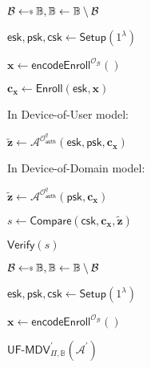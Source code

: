 \begin{figure}[h]
\centering
\vspace*{-\multicolsep}
\begin{multicols}{2}

	\begin{minipage}[t]{0.9\linewidth}
	\begin{algorithm}[H]
	\caption{$\textsf{UF-MDV}_{\Pi, \mathbb{B}}(\mathcal{A})$}
	\label{alg:uf-mdv_game}
	\begin{algorithmic}[1]
		\State $\mathcal{B} \getsdollar \mathbb{B}, \mathbb{B} \gets \mathbb{B} \setminus \mathcal{B}$

		\State $\textsf{esk}, \textsf{psk}, \textsf{csk} \gets \textsf{Setup}(1^\lambda)$

		\State $\mathbf{x} \gets \textsf{encodeEnroll}^{\mathcal{O}_{\mathcal{B}}}()$

		\State $\mathbf{c_x} \gets \textsf{Enroll}(\textsf{esk}, \mathbf{x})$

		\State In Device-of-User model:
		
		\State \hspace{\algorithmicindent} ${\mathbf{\tilde{z}}} \gets \mathcal{A}^{ \mathcal{O}_\textsf{auth}^q } (\textsf{esk}, \textsf{psk}, \mathbf{c_x} )$

		\State In Device-of-Domain model:
		
		\State \hspace{\algorithmicindent} ${\mathbf{\tilde{z}}} \gets \mathcal{A}^{ \mathcal{O}_\textsf{auth}^q } ( \textsf{psk}, \mathbf{c_x} )$

		\State $s \gets \textsf{Compare}( \textsf{csk}, \mathbf{c_x}, \mathbf{\tilde{z}} )$

		\State \Return $\textsf{Verify}(s)$
	\end{algorithmic}
	\end{algorithm}
	\end{minipage}
	
	\begin{minipage}[t]{0.9\linewidth}
	\begin{algorithm}[H]
	\caption{$\textsf{UF-MDV}^\prime_{\Pi, \mathbb{B}}(\mathcal{A}^\prime)$}
	\label{alg:uf-mdv-prime_game}
	\begin{algorithmic}[1]
		\State $\mathcal{B} \getsdollar \mathbb{B}, \mathbb{B} \gets \mathbb{B} \setminus \mathcal{B}$

		\State $\textsf{esk}, \textsf{psk}, \textsf{csk} \gets \textsf{Setup}(1^\lambda)$

		\State $\mathbf{x} \gets \textsf{encodeEnroll}^{\mathcal{O}_{\mathcal{B}}}()$


\end{algorithmic}
\end{algorithm}
\end{minipage}
\end{multicols}
\end{figure}
